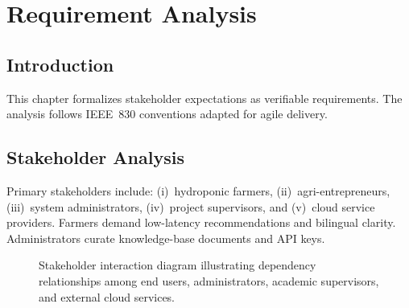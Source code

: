 \chapter{Requirement Analysis}
\label{ch:requirements}

\section{Introduction}
This chapter formalizes stakeholder expectations as verifiable requirements. The analysis follows IEEE~830 conventions adapted for agile delivery.

\section{Stakeholder Analysis}
Primary stakeholders include: (i)~hydroponic farmers, (ii)~agri-entrepreneurs, (iii)~system administrators, (iv)~project supervisors, and (v)~cloud service providers. Farmers demand low-latency recommendations and bilingual clarity. Administrators curate knowledge-base documents and API keys.

\begin{figure}[htbp]
\centering
{}
\caption{Stakeholder interaction diagram illustrating dependency relationships among end users, administrators, academic supervisors, and external cloud services.}
\label{fig:stakeholder_diagram}
\end{figure}

